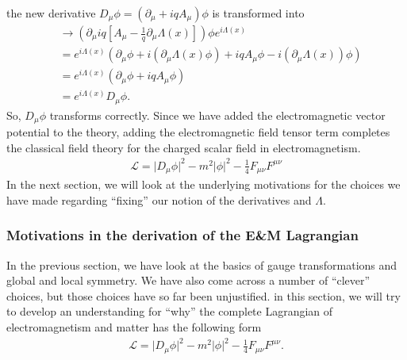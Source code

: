 \documentclass[a4paper,11pt]{article}
\numberwithin{equation}{section}
\theoremstyle{definition}
\newcommand{\p}{\partial}
\newcommand{\lag}{\mathcal{L}}
\begin{document}
the new derivative $D_\mu\phi = (\p_\mu + iqA_\mu)\phi$ is transformed into
\begin{align}
&\to \left( \p_\mu  iq\left[ A_\mu -\frac{1}{q}\p_\mu\Lambda(x)  \right] \right)\phi e^{i\Lambda(x)}\\
&= e^{i\Lambda(x)}\left( \p_\mu\phi + i(\p_\mu\Lambda(x)\phi) + iqA_\mu \phi - i(\p_\mu \Lambda(x))\phi \right)\\
&= e^{i\Lambda(x)}(\p_\mu \phi + iqA_\mu\phi)\\
&= e^{i\Lambda(x)}D_\mu\phi.
\end{align}
So, $D_\mu\phi$ transforms correctly. Since we have added the electromagnetic vector potential to the theory, adding the electromagnetic field tensor term completes the classical field theory for the charged scalar field in electromagnetism. 
\begin{align}
\boxed{\lag = \vert D_\mu \phi\vert^2 - m^2\vert \phi\vert^2 - \frac{1}{4}F_{\mu\nu}F^{\mu\nu} }
\end{align}
In the next section, we will look at the underlying motivations for the choices we have made regarding ``fixing'' our notion of the derivatives and $\Lambda$.


\subsubsection{Motivations in the derivation of the E\&M Lagrangian}
In the previous section, we have look at the basics of gauge transformations and global and local symmetry. We have also come across a number of ``clever'' choices, but those choices have so far been unjustified. in this section, we will try to develop an understanding for ``why'' the complete Lagrangian of electromagnetism and matter has the following form
\begin{align}
\lag = \vert D_\mu \phi\vert^2 - m^2\vert \phi\vert^2 - \frac{1}{4}F_{\mu\nu}F^{\mu\nu} .
\end{align} 
\end{document}
